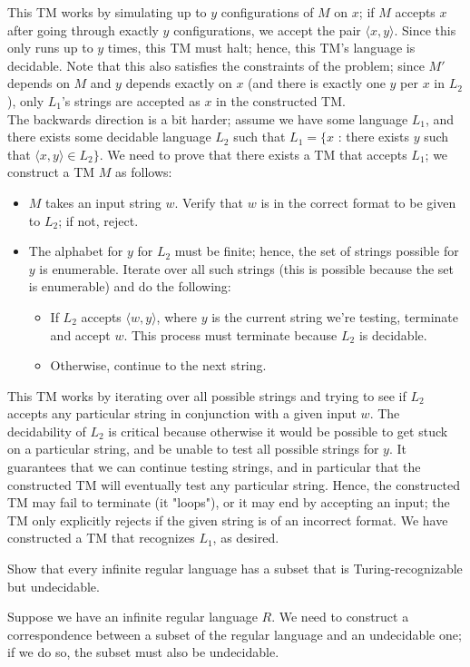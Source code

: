 \documentclass[solution, letterpaper]{cs121}
\begin{document}
\begin{solution}
This TM works by simulating up to $y$ configurations of $M$ on $x$; if $M$ accepts $x$ after going through exactly $y$ configurations, we accept the pair $\langle x,y\rangle$.  Since this only runs up to $y$ times, this TM must halt; hence, this TM's language is decidable.  Note that this also satisfies the constraints of the problem; since $M'$ depends on $M$ and $y$ depends exactly on $x$ (and there is exactly one $y$ per $x$ in $L_2$), only $L_1$'s strings are accepted as $x$ in the constructed TM.
\vspace{0.5cm}
\\\indent The backwards direction is a bit harder; assume we have some language $L_1$, and there exists some decidable language $L_2$ such that $L_1 = \{x$ : there exists $y$ such that $\langle x,y\rangle \in L_2\}$.  We need to prove that there exists a TM that accepts $L_1$; we construct a TM $M$ as follows:
\begin{itemize}
	\setlength\itemsep{0cm}
	\item $M$ takes an input string $w$.  Verify that $w$ is in the correct format to be given to $L_2$; if not, reject.
	\item The alphabet for $y$ for $L_2$ must be finite; hence, the set of strings possible for $y$ is enumerable.  Iterate over all such strings (this is possible because the set is enumerable) and do the following:
	\begin{itemize}
		\item If $L_2$ accepts $\langle w,y \rangle$, where $y$ is the current string we're testing, terminate and accept $w$.  This process must terminate because $L_2$ is decidable.
		\item Otherwise, continue to the next string.
	\end{itemize}
\end{itemize}

This TM works by iterating over all possible strings and trying to see if $L_2$ accepts any particular string in conjunction with a given input $w$.  The decidability of $L_2$ is critical because otherwise it would be possible to get stuck on a particular string, and be unable to test all possible strings for $y$.  It guarantees that we can continue testing strings, and in particular that the constructed TM will eventually test any particular string.  Hence, the constructed TM may fail to terminate (it "loops"), or it may end by accepting an input; the TM only explicitly rejects if the given string is of an incorrect format.  We have constructed a TM that recognizes $L_1$, as desired.
\end{solution}

Show that every infinite regular language has a
subset that is Turing-recognizable but undecidable.

\begin{solution}
Suppose we have an infinite regular language $R$.  We need to construct a correspondence between a subset of the regular language and an undecidable one; if we do so, the subset must also be undecidable.
\end{solution}
\end{document}
